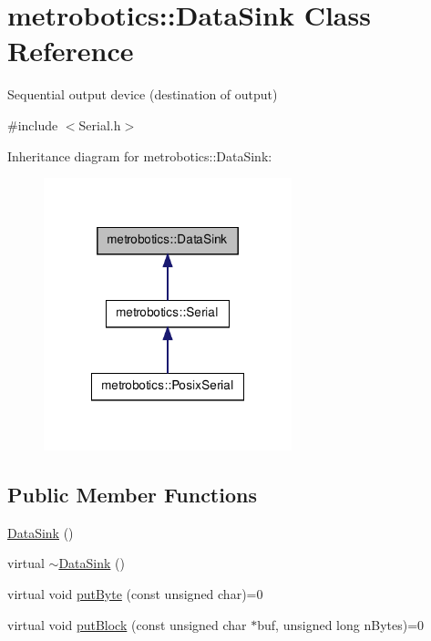 \hypertarget{classmetrobotics_1_1DataSink}{\section{metrobotics\-:\-:\-Data\-Sink \-Class \-Reference}
\label{classmetrobotics_1_1DataSink}
}


\-Sequential output device (destination of output)  




{\ttfamily \#include $<$\-Serial.\-h$>$}



\-Inheritance diagram for metrobotics\-:\-:\-Data\-Sink\-:
\nopagebreak
\begin{figure}[H]
\begin{center}
\leavevmode
\includegraphics[width=204pt]{classmetrobotics_1_1DataSink__inherit__graph}
\end{center}
\end{figure}
\subsection*{\-Public \-Member \-Functions}
\begin{DoxyCompactItemize}
\item 
\hyperlink{classmetrobotics_1_1DataSink_a958c7bd5f7017afc4beec64e381e8ab4}{\-Data\-Sink} ()
\item 
virtual \hyperlink{classmetrobotics_1_1DataSink_afdbbd1c8fa51371fd05348d51c7310f7}{$\sim$\-Data\-Sink} ()
\item 
virtual void \hyperlink{classmetrobotics_1_1DataSink_a2b828ff4ef667925f9b35dd01238141c}{put\-Byte} (const unsigned char)=0
\item 
virtual void \hyperlink{classmetrobotics_1_1DataSink_a4b6fc8b1b32aabbd969fa1ceae11c037}{put\-Block} (const unsigned char $\ast$buf, unsigned long n\-Bytes)=0
\end{DoxyCompactItemize}


